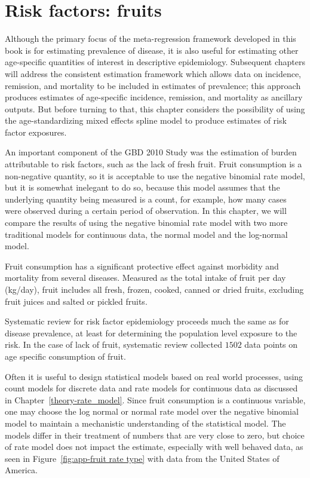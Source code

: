 \chapter{Risk factors: fruits}
\label{applications-log_normal}

Although the primary focus of the meta-regression framework developed
in this book is for estimating prevalence of disease, it is also
useful for estimating other age-specific quantities of interest in
descriptive epidemiology.  Subsequent chapters will address the
consistent estimation framework which allows data on incidence,
remission, and mortality to be included in estimates of prevalence;
this approach produces estimates of age-specific incidence, remission,
and mortality as ancillary outputs.  But before turning to that,
this chapter considers the possibility of using the
age-standardizing mixed effects spline model to produce estimates of
risk factor exposures.

An important component of the GBD 2010 Study
was the estimation of burden attributable to risk factors, such as
the lack of fresh fruit.  Fruit consumption is a non-negative
quantity, so it is acceptable to use
the negative binomial rate model, but it is somewhat inelegant to
do so, because this model assumes that the underlying quantity being
measured is a count, for example, how many cases were observed during a
certain period of observation.  In this chapter, we will compare the results of
using the negative binomial rate model with two more traditional
models for continuous data, the normal model and the log-normal model.

Fruit consumption has a significant protective
effect against morbidity and mortality from several diseases.
Measured as the total intake of fruit per day (kg/day), fruit
includes all fresh, frozen, cooked, canned or dried fruits, excluding
fruit juices and salted or pickled fruits. \cite{he_increased_2007,
  boeing_intake_2006}

Systematic review for
risk factor epidemiology proceeds much the same as for disease
prevalence, at least for determining the population level exposure to
the risk.  In the case of lack of fruit, systematic review collected
$1502$ data points on age specific consumption of fruit.

Often it is useful to design statistical models based on real world
processes, using count models for discrete data and rate models for
continuous data as discussed in Chapter~\ref{theory-rate_model}.
Since fruit consumption is a continuous variable, one may choose the
log normal or normal rate model over the negative binomial model to
maintain a mechanistic understanding of the statistical model.  The
models differ in their treatment of numbers that are very close to
zero, but choice of rate model does not impact the estimate,
especially with well behaved data, as seen in 
Figure~\ref{fig:app-fruit rate type} with data from the United States of
America.

